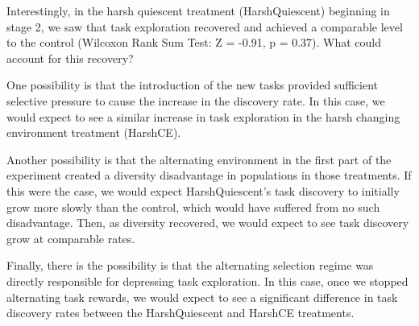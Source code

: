 \documentclass[10pt,letterpaper,final]{article}
\begin{document}
Interestingly, in the harsh quiescent treatment (HarshQuiescent) beginning in stage 2, we saw that task exploration recovered and achieved a comparable level to the control (Wilcoxon Rank Sum Test: Z = -0.91, p = 0.37). What could account for this recovery? 

One possibility is that the introduction of the new tasks provided sufficient selective pressure to cause the increase in the discovery rate. In this case, we would expect to see a similar increase in task exploration in the harsh changing environment treatment (HarshCE). 

Another possibility is that the alternating environment in the first part of the experiment created a diversity disadvantage in populations in those treatments. If this were the case, we would expect HarshQuiescent's task discovery to initially grow more slowly than the control, which would have suffered from no such disadvantage. Then, as diversity recovered, we would expect to see task discovery grow at comparable rates.

Finally, there is the possibility is that the alternating selection regime was directly responsible for depressing task exploration. In this case, once we stopped alternating task rewards, we would expect to see a significant difference in task discovery rates between the HarshQuiescent and HarshCE treatments. 
\end{document}
